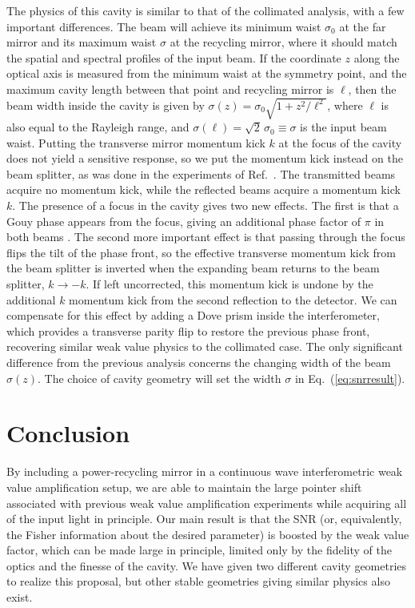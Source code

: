The physics of this cavity is similar to that of the collimated analysis, with a few important differences.  The beam will achieve its minimum waist $\sigma_0$ at the far mirror and its maximum waist $\sigma$ at the recycling mirror, where it should match the spatial and spectral profiles of the input beam.  If the coordinate $z$ along the optical axis is measured from the minimum waist at the symmetry point, and the maximum cavity length between that point and recycling mirror is $\ell$, then the beam width inside the cavity is given by $\sigma(z) = \sigma_0\sqrt{1 + z^2/\ell^2}$, where $\ell$ is also equal to the Rayleigh range, and $\sigma(\ell) = \sqrt{2}\,\sigma_0 \equiv \sigma$ is the input beam waist. 
Putting the transverse mirror momentum kick $k$ at the focus of the cavity does not yield a sensitive response, so we put the momentum kick instead on the beam splitter, as was done in the experiments of Ref.~\cite{Viza2014}.  The transmitted beams acquire no momentum kick, while the reflected beams acquire a momentum kick $k$.
The presence of a focus in the cavity gives two new effects.  The first is that a Gouy phase appears from the focus, giving an additional phase factor of $\pi$ in both beams \cite{Milonni2010}.  The second more important effect is that passing through the focus flips the tilt of the phase front, so the effective transverse momentum kick from the beam splitter is inverted when the expanding beam returns to the beam splitter, $k \rightarrow -k$.  If left uncorrected, this momentum kick is undone by the additional $k$ momentum kick from the second reflection to the detector.  We can compensate for this effect by adding a Dove prism inside the interferometer, which provides a transverse parity flip to restore the previous phase front, recovering similar weak value physics to the collimated case.  The only significant difference from the previous analysis 
concerns the changing width of the beam $\sigma(z)$.  The choice of cavity geometry will set the width $\sigma$ in Eq.~(\ref{eq:snrresult}).



\section{Conclusion}
By including a power-recycling mirror in a continuous wave interferometric weak value amplification setup, we are able to maintain the large pointer shift associated with previous weak value amplification experiments while acquiring all of the input light in principle.  Our main result is that the SNR (or, equivalently, the Fisher information about the desired parameter) is boosted by the weak value factor, which can be made large in principle, limited only by the fidelity of the optics and the finesse of the cavity.  We have given two different cavity geometries to realize this proposal, but other stable geometries giving similar physics also exist.

